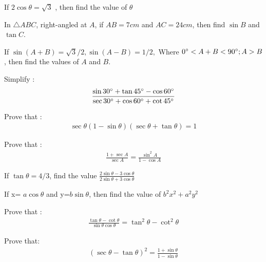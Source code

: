 \item If $2\cos  \theta = \sqrt{3}$ , then find the value of $\theta$
\hfill{}\item  In $\triangle ABC$, right-angled at $A$, if $AB=7 cm$ and $AC=24 cm$, then find $\sin B$
and $\tan C$.

\hfill{}\item If  $\sin (A+B) = \sqrt{3}/2,
 \sin (A-B) = 1/2,$ Where $0\degree<A+B<90\degree; A>B$, then find the values of $A$ and $B$.

\hfill{}\item  Simplify :
\begin{align}
\frac{\sin 30\degree + \tan 45\degree-\cos 60\degree}{\sec 30\degree + \cos 60\degree + \cot 45\degree} 
\end{align}


\hfill{}\item Prove that :
\begin{align}
 \sec \theta (1-\sin\theta)(\sec\theta+ \tan\theta)=1
\end{align}

\hfill{}\item Prove that :
\begin{align}
\frac{1+\sec A}{\sec A}=\frac{\sin^2 A}{1-\cos A} 
\end{align}

\hfill{}\item If  $\tan \theta = 4/3$, find the value 
$\frac{2\sin \theta -3\cos \theta}{2\sin\theta+3\cos\theta}$

\hfill{}\item If x=  $a\cos\theta$ and y=$b\sin\theta$, then find the value of   $b^2x^2+a^2y^2$

\hfill{}\item Prove that :
\begin{align}
\frac{\tan\theta-\cot\theta}{\sin\theta\cos\theta}=\tan^2\theta-\cot^2\theta 
\end{align}
\hfill{}\item Prove that:
\begin{align}
(\sec\theta-\tan\theta)^2 =\frac{1+\sin\theta}{1-\sin\theta}
\end{align}

